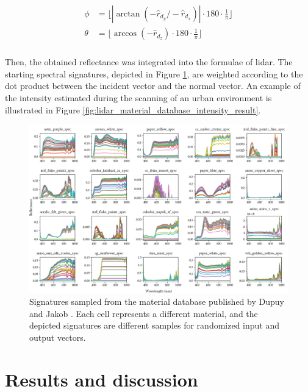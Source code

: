 \begin{gather}
    \label{eq:lidar_azimuth_elevation}
    \begin{aligned}
        \phi &= \lfloor{\left|\arctan\left(-\widehat{r}_{d_{y}}/-\widehat{r}_{d_{x}}\right)\right| \cdot 180 \cdot \frac{1}{\pi} \rfloor}\\
        \theta &= \lfloor{\arccos\left(-\widehat{r}_{d_{z}}\right) \cdot 180 \cdot \frac{1}{\pi} \rfloor}\\
    \end{aligned}
\end{gather}

Then, the obtained reflectance was integrated into the formulae of \acrshort{lidar}. The starting spectral signatures, depicted in Figure \ref{fig:brdf_merl_examples}, are weighted according to the dot product between the incident vector and the normal vector. An example of the intensity estimated during the scanning of an urban environment is illustrated in Figure \ref{fig:lidar_material_database_intensity_result}. 

\begin{figure}[hbt]
	\centering
	\includegraphics[width=\linewidth]{figs/lidar_intensity/brdf_database_examples.png}
	\caption{Signatures sampled from the material database published by Dupuy and Jakob \cite{dupuy_adaptive_2018}. Each cell represents a different material, and the depicted signatures are different samples for randomized input and output vectors. }
	\label{fig:brdf_merl_examples}
\end{figure}

\section{Results and discussion}

